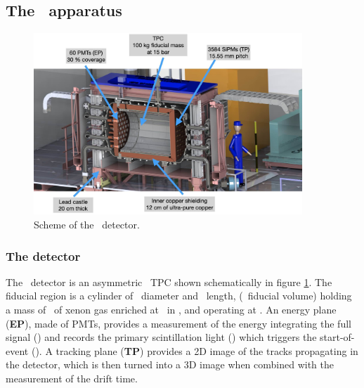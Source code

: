 \subsection{The \Next\ apparatus}
\label{sec.next100}

\begin{figure}[htbp!]
\centering
\includegraphics[width=0.9\textwidth]{img2/NEXT-100-description.jpg}
\caption{\small Scheme of the \NEXT\ detector.}
\label{fig.next-100}
\end{figure}

\subsubsection{The detector}

The \Next\ detector is an asymmetric \HPXeEL\ TPC shown schematically in figure \ref{fig.next-100}.  The fiducial region is a cylinder of \NextTpcDiameter\ diameter and \NextTpcLength\ length, (\NextFiducialVolume\ fiducial volume) holding a mass of \NextFiducialMass\ of xenon gas enriched at \XeEnrichment\ in \XE, and operating at \NextPressure.  An energy plane ({\bf EP}),
made of PMTs, provides a measurement of the energy integrating the full signal (\stwo) and records the primary scintillation light (\sone) which triggers the start-of-event (\tz). A tracking plane ({\bf TP}) provides a 2D image of the tracks propagating in the detector, which is then turned into a 3D image when combined with the measurement of the drift time.  


